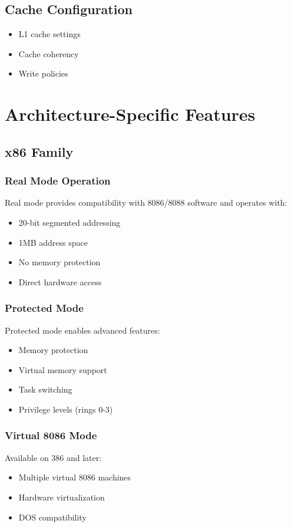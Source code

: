 \documentclass[a4paper,11pt]{book}
\begin{document}
\section{Cache Configuration}
\begin{itemize}
    \item L1 cache settings
    \item Cache coherency
    \item Write policies
\end{itemize}

\chapter{Architecture-Specific Features}
\section{x86 Family}
\subsection{Real Mode Operation}
Real mode provides compatibility with 8086/8088 software and operates with:
\begin{itemize}
    \item 20-bit segmented addressing
    \item 1MB address space
    \item No memory protection
    \item Direct hardware access
\end{itemize}

\subsection{Protected Mode}
Protected mode enables advanced features:
\begin{itemize}
    \item Memory protection
    \item Virtual memory support
    \item Task switching
    \item Privilege levels (rings 0-3)
\end{itemize}

\subsection{Virtual 8086 Mode}
Available on 386 and later:
\begin{itemize}
    \item Multiple virtual 8086 machines
    \item Hardware virtualization
    \item DOS compatibility
\end{itemize}
\end{document}

